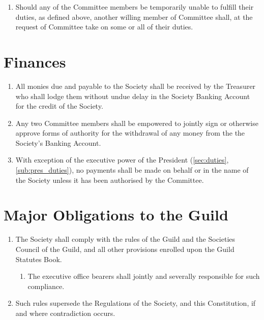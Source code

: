 \documentclass[a4paper]{article}
\begin{document}
\begin{enumerate}
    \item Should any of the Committee members be temporarily unable to fulfill their duties, as defined above, another willing member of Committee shall, at the request of Committee take on some or all of their duties.
\end{enumerate}


\section{Finances} \label{sec:finances}
\begin{enumerate}
	\item All monies due and payable to the Society shall be received by the Treasurer who shall lodge them without undue delay in the Society Banking Account for the credit of the Society.
    \item Any two Committee members shall be empowered to jointly sign or otherwise approve forms of authority for the withdrawal of any money from the the Society's Banking Account.
    \item With exception of the executive power of the President (\cref{sec:duties}, \cref{sub:pres_duties}), no payments shall be made on behalf or in the name of the Society unless it has been authorised by the Committee.
\end{enumerate}

\section{Major Obligations to the Guild} \label{sec:guild_obligations}
\begin{enumerate}
    \item The Society shall comply with the rules of the Guild and the Societies Council of the Guild, and all other provisions enrolled upon the Guild Statutes Book.
    \begin{enumerate}
        \item The executive office bearers shall jointly and severally responsible for such compliance.
    \end{enumerate}
    \item Such rules supersede the Regulations of the Society, and this Constitution, if and where contradiction occurs.
\end{enumerate}
\end{document}
